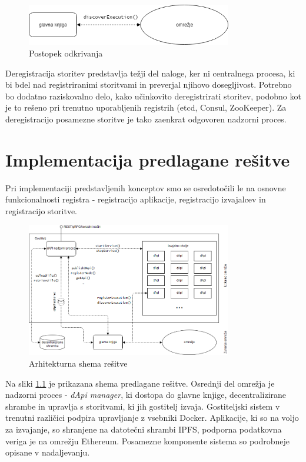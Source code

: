 \documentclass[a4paper, 12pt]{book}
\begin{document}
\begin{figure}[h]
	\centering
	\includegraphics[width=0.8\textwidth]{slike/discover_service.png}
	\caption{Postopek odkrivanja}
	\label{discover_service}
\end{figure}

Deregistracija storitev predstavlja težji del naloge, ker ni centralnega procesa, ki bi bdel nad registriranimi storitvami in preverjal njihovo dosegljivost.
Potrebno bo dodatno raziskovalno delo, kako učinkovito deregistrirati storitev, podobno kot je to rešeno pri trenutno uporabljenih registrih (etcd, Consul, ZooKeeper).
Za deregistracijo posamezne storitve je tako zaenkrat odgovoren nadzorni proces.

\chapter{Implementacija predlagane rešitve}
\label{ch5}

Pri implementaciji predstavljenih konceptov smo se osredotočili le na osnovne funkcionalnosti registra - registracijo aplikacije, registracijo izvajalcev in registracijo storitve.

\begin{figure}[h]
	\includegraphics[width=0.8\textwidth]{slike/dApi_sl.png}
	\caption{Arhitekturna shema rešitve}
	\label{scheme}
\end{figure}

Na sliki \ref{scheme} je prikazana shema predlagane rešitve. Osrednji del omrežja je nadzorni proces - 
\textit{dApi manager}, ki dostopa do glavne knjige, decentralizirane shrambe in upravlja s storitvami, ki jih gostitelj izvaja.
Gostiteljski sistem v trenutni različici podpira upravljanje z vsebniki Docker.
Aplikacije, ki so na voljo za izvajanje, so shranjene na datotečni shrambi IPFS, podporna podatkovna veriga je na omrežju Ethereum. Posamezne komponente sistema so podrobneje opisane v nadaljevanju.
\end{document}
